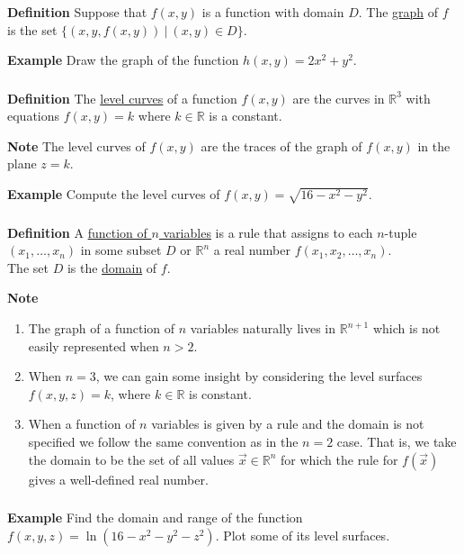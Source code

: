 \begin{frame}[fragile]\frametitle{}

\textbf{Definition}
Suppose that $f(x,y)$ is a function with domain $D$.  The \underline{graph} of $f$ is the set $\{(x,y,f(x,y)) \ |\ (x,y)\in D\}$.
 

\textbf{Example}
Draw the graph of the function $h(x,y)= 2x^2 + y^2$.

\end{frame}

\begin{frame}[fragile]\frametitle{}
\textbf{Definition}
The \underline{level curves} of a function $f(x,y)$ are the curves in $\mathbb R^3$ with equations $f(x,y)=k$ where $k\in \mathbb R$ is a constant.
 

\textbf{Note}
The level curves of $f(x,y)$ are the traces of the graph of $f(x,y)$ in the plane $z=k$.
 

\textbf{Example}
Compute the level curves of $f(x,y)=\sqrt{16-x^2-y^2}$.

\end{frame}

\begin{frame}[fragile]\frametitle{}
 
\textbf{Definition}
 A \underline{function of $n$ variables} is a rule that assigns to each $n$-tuple $(x_1,\dots, x_n)$ in some subset $D$ or $\mathbb R^n$ a real number $f(x_1,x_2,\dots,x_n)$. \\   
 The set $D$ is the \underline{domain} of $f$.



\textbf{Note}
\begin{enumerate}
 \item  The graph of a function of $n$ variables naturally lives in $\mathbb R^{n+1}$ which is not easily represented when $n>2$.  
 \item  When $n=3$, we can gain some insight by considering the level surfaces $f(x,y,z)=k$, where $k\in \mathbb R$ is constant.  
 \item  When a function of $n$ variables is given by a rule and the domain is not specified we follow the same convention as in the $n=2$ case.  That is, we take the domain to be the set of all values $\vec{x}\in\mathbb R^n$ for which the rule for $f(\vec{x})$ gives a well-defined real number.
\end{enumerate}

\end{frame}


\begin{frame}[fragile]\frametitle{}
 
\textbf{Example}
 Find the domain and range of the function $f(x,y,z)= \ln(16-x^2-y^2-z^2)$.  Plot some of its level surfaces.

\end{frame}

